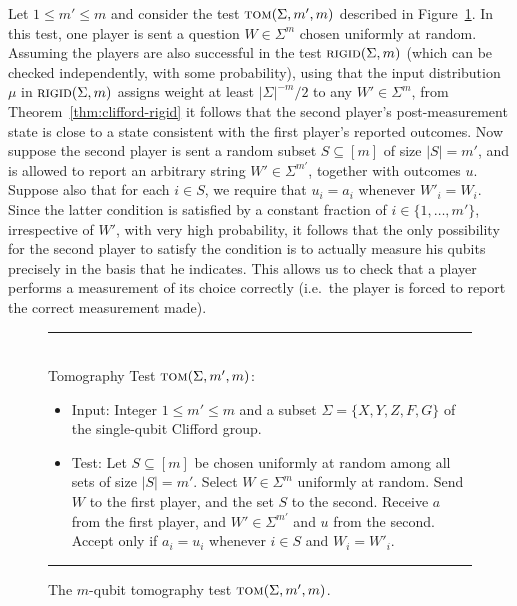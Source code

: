 Let $1\leq m'\leq m$ and consider the test $\textsc{tom}(\Sigma,m',m)$ described in Figure~\ref{fig:tomography-test}. In this test, one player is sent a question $W\in\Sigma^{m}$ chosen uniformly at random. Assuming the players are also successful in the test $\textsc{rigid}(\Sigma,m)$ (which can be checked independently, with some probability), using that the input distribution $\mu$ in $\textsc{rigid}(\Sigma,m)$ assigns weight at least $|\Sigma|^{-m}/2$ to any $W'\in \Sigma^{m}$, from Theorem~\ref{thm:clifford-rigid} it follows that the second player's post-measurement state is close to a state consistent with the first player's reported outcomes. Now suppose the second player is sent a random subset $S\subseteq [m]$ of size $|S|=m'$, and is allowed to report an arbitrary string $W'\in \Sigma^{m'}$, together with outcomes $u$. Suppose also that for each $i\in S$, we require that $u_i=a_i$ whenever $W'_i=W_i$. Since the latter condition is satisfied by a constant fraction of $i\in\{1,\ldots,m'\}$, irrespective of $W'$, with very high probability, it follows that the only possibility for the second player to satisfy the condition is to actually measure his qubits precisely in the basis that he indicates. This allows us to check that a player performs a measurement of its choice correctly (i.e.\ the player is forced to report the correct measurement made).

\begin{figure}[H]
\rule[1ex]{\textwidth}{0.5pt}\\
Tomography Test $\textsc{tom}(\Sigma,m',m)$: 
\begin{itemize}
    \item Input: Integer $1\leq m'\leq m$ and a subset $\Sigma = \{X,Y,Z,F,G\}$ of the single-qubit Clifford group. 
    \item Test: Let $S\subseteq [m]$ be chosen uniformly at random among all sets of size $|S|=m'$. Select $W\in\Sigma^{m}$ uniformly at random. Send $W$ to the first player, and the set $S$ to the second. Receive $a$ from the first player, and $W'\in\Sigma^{m'}$ and $u$ from the second. Accept only if $a_i=u_i$ whenever $i\in S$ and $W_i=W'_i$. 
\end{itemize}
\rule[2ex]{\textwidth}{0.5pt}\vspace{-.5cm}
\caption{The $m$-qubit tomography test $\textsc{tom}(\Sigma,m',m)$.}
\label{fig:tomography-test}
\end{figure} 

